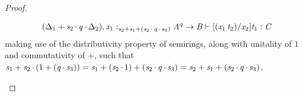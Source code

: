 \begin{proof}
\begin{enumerate}
\begin{align*}
          {\GRANULEsym{(}  \Delta_{{\mathrm{1}}}  \GRANULEsym{+}   \textcolor{coeffectColor}{ \GRANULEnt{s_{{\mathrm{2}}}}   \textcolor{coeffectColor}{\,\cdot\,} }    \textcolor{coeffectColor}{ \GRANULEnt{q}   \textcolor{coeffectColor}{\,\cdot\,} }  \Delta_{{\mathrm{2}}}     \GRANULEsym{)}  \GRANULEsym{,}   \GRANULEmv{x_{{\mathrm{1}}}}  :_{\textcolor{coeffectColor}{   \GRANULEnt{s_{{\mathrm{2}}}}  \GRANULEsym{+}   \GRANULEnt{s_{{\mathrm{1}}}}  \GRANULEsym{+}  \GRANULEsym{(}  \GRANULEnt{s_{{\mathrm{2}}}}  \textcolor{coeffectColor}{\,\cdot\,}   \GRANULEnt{q}  \textcolor{coeffectColor}{\,\cdot\,}  \GRANULEnt{s_{{\mathrm{3}}}}   \GRANULEsym{)}    } }    \GRANULEnt{A} ^ \GRANULEnt{q}  \rightarrow  \GRANULEnt{B}    \vdash    [  \GRANULEsym{(}  \GRANULEmv{x_{{\mathrm{1}}}} \, \GRANULEnt{t_{{\mathrm{2}}}}  \GRANULEsym{)}  /  \GRANULEmv{x_{{\mathrm{2}}}}  ]  \GRANULEnt{t_{{\mathrm{1}}}}    :  \GRANULEnt{C}}
        \end{align*}
        making use of the distributivity property of semirings, along with unitality of $1$
        and commutativity of $+$, such that
        $\GRANULEnt{s_{{\mathrm{1}}}}  \GRANULEsym{+}  \GRANULEnt{s_{{\mathrm{2}}}}  \textcolor{coeffectColor}{\,\cdot\,}  \GRANULEsym{(}   1   \GRANULEsym{+}  \GRANULEsym{(}  \GRANULEnt{q}  \textcolor{coeffectColor}{\,\cdot\,}  \GRANULEnt{s_{{\mathrm{3}}}}  \GRANULEsym{)}  \GRANULEsym{)} =  \GRANULEnt{s_{{\mathrm{1}}}}  \GRANULEsym{+}  \GRANULEsym{(}  \GRANULEnt{s_{{\mathrm{2}}}}  \textcolor{coeffectColor}{\,\cdot\,}   1   \GRANULEsym{)}  \GRANULEsym{+}  \GRANULEsym{(}  \GRANULEnt{s_{{\mathrm{2}}}}  \textcolor{coeffectColor}{\,\cdot\,}  \GRANULEnt{q}  \textcolor{coeffectColor}{\,\cdot\,}  \GRANULEnt{s_{{\mathrm{3}}}}  \GRANULEsym{)} = \GRANULEnt{s_{{\mathrm{2}}}}  \GRANULEsym{+}  \GRANULEnt{s_{{\mathrm{1}}}}  \GRANULEsym{+}  \GRANULEsym{(}  \GRANULEnt{s_{{\mathrm{2}}}}  \textcolor{coeffectColor}{\,\cdot\,}  \GRANULEnt{q}  \textcolor{coeffectColor}{\,\cdot\,}  \GRANULEnt{s_{{\mathrm{3}}}}  \GRANULEsym{)}$.


\end{enumerate}
\end{proof}
